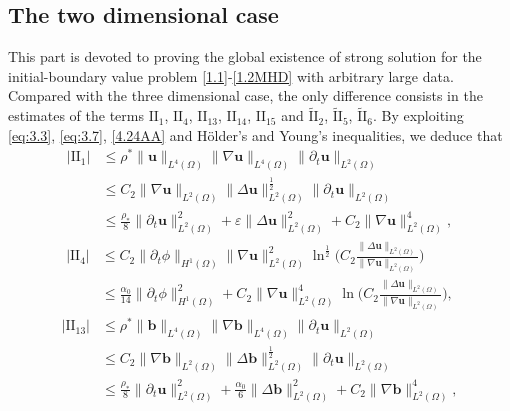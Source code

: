 \documentclass[11pt]{article}
\numberwithin{equation}{section}
\begin{document}
\subsection{The two  dimensional case}
This part is devoted to  proving the global existence of strong solution for the initial-boundary value problem
	\eqref{1.1}-\eqref{1.2MHD}   with arbitrary large data. Compared with the three dimensional case, the only difference consists in the estimates of the terms $\text{II}_1$, $\text{II}_4$, $\text{II}_{13}$, $\text{II}_{14}$, $\text{II}_{15}$ and $ \tilde{\text{II}}_2$, $ \tilde{\text{II}}_5$, $ \tilde{\text{II}}_6$. By exploiting \eqref{eq:3.3}, \eqref{eq:3.7}, \eqref{4.24AA} and  H\"{o}lder's and Young's inequalities,  we deduce that
\begin{equation}\label{4.59}
\begin{split}
|\text{II}_1|&\leq \rho^*\|\mathbf{u}\|_{L^4(\Omega)}\|\nabla \mathbf{u}\|_{L^4(\Omega)}\|\partial_t \mathbf{u}\|_{L^2(\Omega)}\\
&\leq C_{2}\|\nabla \mathbf{u}\|_{L^2(\Omega)}\|\Delta \mathbf{u}\|_{L^2(\Omega)}^{\frac{1}{2}}\|\partial_t \mathbf{u}\|_{L^2(\Omega)}\\
&\leq \frac{\rho_*}{8}\|\partial_t \mathbf{u}\|_{L^2(\Omega)}^2+\varepsilon\|\Delta \mathbf{u}\|_{L^2(\Omega)}^2+C_{2}\|\nabla \mathbf{u}\|_{L^2(\Omega)}^4,
\end{split}
\end{equation}
\begin{equation}\label{4.60}
\begin{split}
|\text{II}_4|&\leq C_{2}\|\partial_t\phi\|_{H^1(\Omega)}\|\nabla \mathbf{u}\|_{L^2(\Omega)}^2\ln^{\frac{1}{2}}\Big(C_{2}\frac{\|\Delta \mathbf{u}\|_{L^2(\Omega)}}{\|\nabla \mathbf{u}\|_{L^2(\Omega)}}\Big)\\
&\leq \frac{\alpha_0}{14}\|\partial_t\phi\|_{H^1(\Omega)}^2+C_{2}\|\nabla \mathbf{u}\|_{L^2(\Omega)}^4\ln\Big(C_{2}\frac{\|\Delta \mathbf{u}\|_{L^2(\Omega)}}{\|\nabla \mathbf{u}\|_{L^2(\Omega)}}\Big),
\end{split}
\end{equation}
\begin{equation}\label{4.61}
\begin{split}
|\text{II}_{13}|&\leq \rho^*\|\mathbf{b}\|_{L^4(\Omega)}\|\nabla\mathbf{b}\|_{L^4(\Omega)}
\|\partial_t\mathbf{u}\|_{L^2(\Omega)} \\
&\leq C_{2}\|\nabla\mathbf{b}\|_{L^2(\Omega)}
\|\Delta\mathbf{b}\|_{L^2(\Omega)}^{\frac{1}{2}}
\|\partial_t\mathbf{u}\|_{L^2(\Omega)}\\
&\leq \frac{\rho_*}{8}\|\partial_t\mathbf{u}\|_{L^2(\Omega)}^2
+\frac{\alpha_0}{6}\|\Delta\mathbf{b}\|_{L^2(\Omega)}^2 + C_{2}\|\nabla\mathbf{b}\|_{L^2(\Omega)}^4,
\end{split}
\end{equation}
\end{document}
